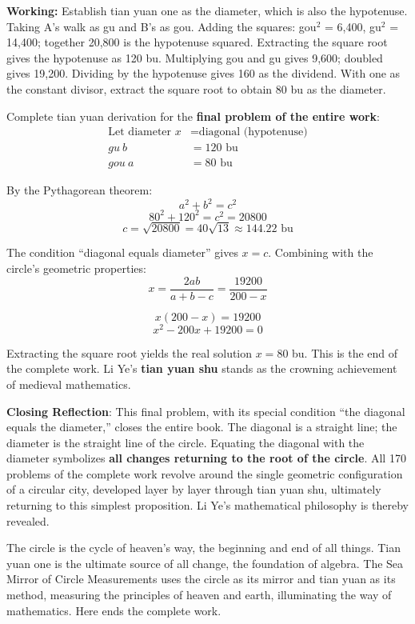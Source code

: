 \documentclass[11pt,a4paper]{book}
\newcommand{\working}[1]{\noindent\textbf{\color{workcolor}Working: }#1\par}
\begin{document}
\working{Establish tian yuan one as the diameter, which is also the hypotenuse. Taking A's walk as gu and B's as gou. Adding the squares: gou$^2$ = 6,400, gu$^2$ = 14,400; together 20,800 is the hypotenuse squared. Extracting the square root gives the hypotenuse as 120 bu. Multiplying gou and gu gives 9,600; doubled gives 19,200. Dividing by the hypotenuse gives 160 as the dividend. With one as the constant divisor, extract the square root to obtain 80 bu as the diameter.

Complete tian yuan derivation for the \textbf{final problem of the entire work}:
\begin{align*}
\text{Let diameter } x &= \text{diagonal (hypotenuse)} \\
gu \ b &= 120 \text{ bu} \\
gou \ a &= 80 \text{ bu}
\end{align*}

By the Pythagorean theorem:
$$a^2 + b^2 = c^2$$
$$80^2 + 120^2 = c^2 = 20800$$
$$c = \sqrt{20800} = 40\sqrt{13} \approx 144.22 \text{ bu}$$

The condition ``diagonal equals diameter'' gives $x = c$. Combining with the circle's geometric properties:
$$x = \frac{2ab}{a + b - c} = \frac{19200}{200 - x}$$

$$x(200 - x) = 19200$$
$$x^2 - 200x + 19200 = 0$$

Extracting the square root yields the real solution $x = 80$ bu. This is the end of the complete work. Li Ye's \textbf{tian yuan shu} stands as the crowning achievement of medieval mathematics.

\textbf{Closing Reflection}: This final problem, with its special condition ``the diagonal equals the diameter,'' closes the entire book. The diagonal is a straight line; the diameter is the straight line of the circle. Equating the diagonal with the diameter symbolizes \textbf{all changes returning to the root of the circle}. All 170 problems of the complete work revolve around the single geometric configuration of a circular city, developed layer by layer through tian yuan shu, ultimately returning to this simplest proposition. Li Ye's mathematical philosophy is thereby revealed.

The circle is the cycle of heaven's way, the beginning and end of all things. Tian yuan one is the ultimate source of all change, the foundation of algebra. The Sea Mirror of Circle Measurements uses the circle as its mirror and tian yuan as its method, measuring the principles of heaven and earth, illuminating the way of mathematics. Here ends the complete work.}
\end{document}
